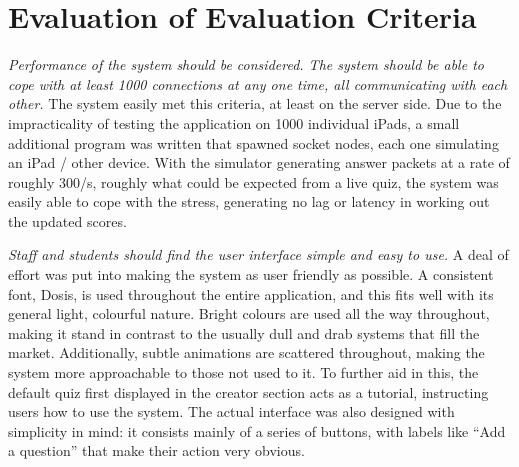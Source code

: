 \section{Evaluation of Evaluation Criteria} %
\label{sec:evaluation_of_evaluation_criteria}
\textit{Performance of the system should be considered. The system should be able to cope with at least 1000 connections at any one time, all communicating with each other.} The system easily met this criteria, at least on the server side. Due to the impracticality of testing the application on 1000 individual iPads, a small additional program was written that spawned socket nodes, each one simulating an iPad / other device. With the simulator generating answer packets at a rate of roughly 300/s, roughly what could be expected from a live quiz, the system was easily able to cope with the stress, generating no lag or latency in working out the updated scores.

\textit{Staff and students should find the user interface simple and easy to use.} A deal of effort was put into making the system as user friendly as possible. A consistent font, Dosis, is used throughout the entire application, and this fits well with its general light, colourful nature. Bright colours are used all the way throughout, making it stand in contrast to the usually dull and drab systems that fill the market. Additionally, subtle animations are scattered throughout, making the system more approachable to those not used to it. To further aid in this, the default quiz first displayed in the creator section acts as a tutorial, instructing users how to use the system. The actual interface was also designed with simplicity in mind: it consists mainly of a series of buttons, with labels like ``Add a question'' that make their action very obvious.

